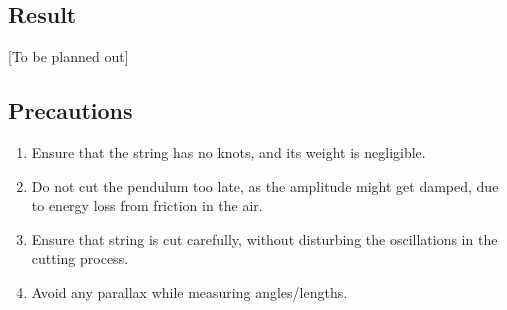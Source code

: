 \subsection{Result}
[To be planned out]
\subsection{Precautions}
\begin{enumerate}
\item Ensure that the string has no knots, and its weight is negligible.
\item Do not cut the pendulum too late, as the amplitude might get damped, due to energy loss from friction in the air.
\item Ensure that string is cut carefully, without disturbing the oscillations in the cutting process.
\item Avoid any parallax while measuring angles/lengths.
\end{enumerate}



  

                                                                           
